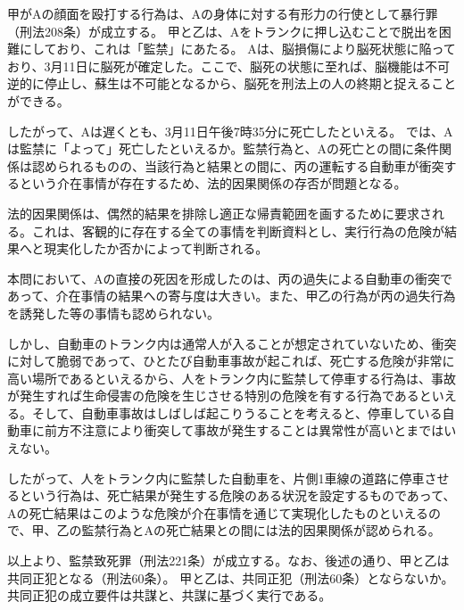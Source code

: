\documentclass[11pt]{jsarticle}
\title{\vspace{-30mm}{\textgt{\Large{\fbox{８} トランク監禁の悲劇}}}}
\date{\vspace{-15mm}}
\begin{document}
\maketitle

	甲がAの顔面を殴打する行為は、Aの身体に対する有形力の行使として暴行罪（刑法208条）が成立する。
		
			\sectionC{}
				甲と乙は、Aをトランクに押し込むことで脱出を困難にしており、これは「監禁」にあたる。
			\sectionC{}
				Aは、脳損傷により脳死状態に陥っており、3月11日に脳死が確定した。ここで、脳死の状態に至れば、脳機能は不可逆的に停止し、蘇生は不可能となるから、脳死を刑法上の人の終期と捉えることができる。
				
				したがって、Aは遅くとも、3月11日午後7時35分に死亡したといえる。
			\sectionC{}
				では、Aは監禁に「よって」死亡したといえるか。監禁行為と、Aの死亡との間に条件関係は認められるものの、当該行為と結果との間に、丙の運転する自動車が衝突するという介在事情が存在するため、法的因果関係の存否が問題となる。
				
				法的因果関係は、偶然的結果を排除し適正な帰責範囲を画するために要求される。これは、客観的に存在する全ての事情を判断資料とし、実行行為の危険が結果へと現実化したか否かによって判断される。
				
				本問において、Aの直接の死因を形成したのは、丙の過失による自動車の衝突であって、介在事情の結果への寄与度は大きい。また、甲乙の行為が丙の過失行為を誘発した等の事情も認められない。
				
				しかし、自動車のトランク内は通常人が入ることが想定されていないため、衝突に対して脆弱であって、ひとたび自動車事故が起これば、死亡する危険が非常に高い場所であるといえるから、人をトランク内に監禁して停車する行為は、事故が発生すれば生命侵害の危険を生じさせる特別の危険を有する行為であるといえる。そして、自動車事故はしばしば起こりうることを考えると、停車している自動車に前方不注意により衝突して事故が発生することは異常性が高いとまではいえない。
				
				したがって、人をトランク内に監禁した自動車を、片側1車線の道路に停車させるという行為は、死亡結果が発生する危険のある状況を設定するものであって、Aの死亡結果はこのような危険が介在事情を通じて実現化したものといえるので、甲、乙の監禁行為とAの死亡結果との間には法的因果関係が認められる。
				
				以上より、監禁致死罪（刑法221条）が成立する。なお、後述の通り、甲と乙は共同正犯となる（刑法60条）。
			甲と乙は、共同正犯（刑法60条）とならないか。共同正犯の成立要件は共謀と、共謀に基づく実行である。
			
\end{document}

